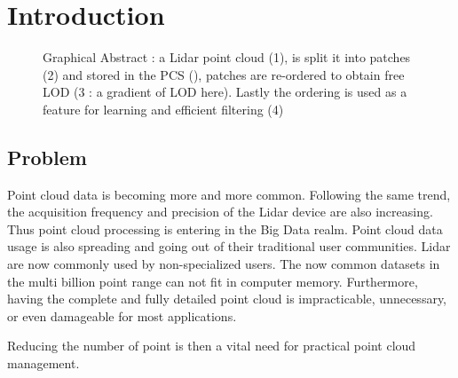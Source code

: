 

\section{Introduction}

\begin{figure}[t!]
	\begin{center}
		\caption{Graphical Abstract : a Lidar point cloud (1), is split it into patches (2) and stored in the PCS (\cite{Cura2015}), patches are re-ordered to obtain free LOD (3 : a gradient of LOD here). Lastly the ordering is used as a feature for learning and efficient filtering (4) } 
		\label{fig:banner_image}
	\end{center}
\end{figure} 

	\subsection{Problem}  
		Point cloud data is becoming more and more common. Following the same trend, the acquisition frequency and precision of the Lidar device are also increasing.
		Thus point cloud processing is entering in the Big Data realm.
		Point cloud data usage is also spreading and going out of their traditional user communities. 
		Lidar are now commonly used by non-specialized users. 
		The now common datasets in the multi billion point range can not fit in computer memory. 
		Furthermore, having the complete and fully detailed point cloud is impracticable, unnecessary, or even damageable for most applications.
		
		Reducing the number of point is then a vital need for practical point cloud management.
		
